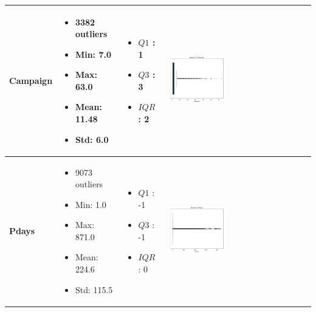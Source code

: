 \documentclass{article}
\begin{document}
\begin{longtable}{|p{}|p{}|p{}|p{}|}
            \hline
            \textbf{Campaign} & 
            \begin{itemize}
                \item 3382 outliers
                \item Min: 7.0
                \item Max: 63.0
                \item Mean: 11.48
                \item Std: 6.0
            \end{itemize} & 
            \begin{itemize}
                \item $Q1$ : 1
                \item $Q3$ : 3
                \item $IQR$ : 2
            \end{itemize} &
            \includegraphics[width=0.40\textwidth]{data/bank_marketing/pic/Outlier/Campaign.png} \\
            \hline
            \textbf{Pdays} & 
            \begin{itemize}
                \item 9073 outliers
                \item Min: 1.0
                \item Max: 871.0
                \item Mean: 224.6
                \item Std: 115.5
            \end{itemize} & 
            \begin{itemize}
                \item $Q1$ : -1
                \item $Q3$ : -1
                \item $IQR$ : 0
            \end{itemize} &
            \includegraphics[width=0.40\textwidth]{data/bank_marketing/pic/Outlier/Pdays.png} \\

\end{longtable}
\end{document}
